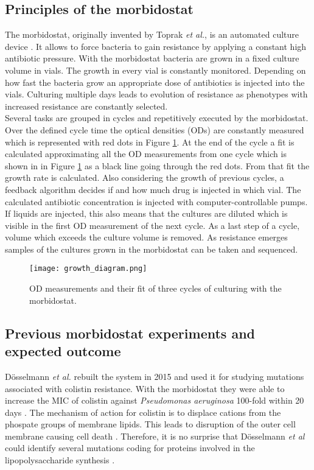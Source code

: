 \subsection{Principles of the morbidostat} 
The morbidostat, originally invented by Toprak \textit{et al.}, is an automated culture device \cite{toprak_building_2013}. It allows to force bacteria to gain resistance by applying a constant high antibiotic pressure. With the morbidostat bacteria are grown in a fixed culture volume in vials. The growth in every vial is constantly monitored. Depending on how fast the bacteria grow an appropriate dose of antibiotics is injected into the vials. Culturing multiple days leads to evolution of resistance as phenotypes with increased resistance are constantly selected. \\
Several tasks are grouped in cycles and repetitively executed by the morbidostat. Over the defined cycle time the optical densities (ODs) are constantly measured which is represented with red dots in Figure \ref{figure:principle}. At the end of the cycle a fit is calculated approximating all the OD measurements from one cycle which is shown in in Figure \ref{figure:principle} as a black line going through the red dots. From that fit the growth rate is calculated. Also considering the growth of previous cycles, a feedback algorithm decides if and how much drug is injected in which vial. The calculated antibiotic concentration is injected with computer-controllable pumps. If liquids are injected, this also means that the cultures are diluted which is visible in the first OD measurement of the next cycle. As a last step of a cycle, volume which exceeds the culture volume is removed. As resistance emerges samples of the cultures grown in the morbidostat can be taken and sequenced.    
\begin{figure}
	\texttt{[image: growth\_diagram.png]}
	\caption{OD measurements and their fit of three cycles of culturing with the morbidostat. }
	\label{figure:principle}
\end{figure} 

\subsection{Previous morbidostat experiments and expected outcome}
Dösselmann \textit{et al.} rebuilt the system in 2015  \cite{doselmann_rapid_2017} and used it for studying mutations associated with colistin resistance. With the morbidostat they were able to increase the MIC of colistin against \textit{Pseudomonas aeruginosa} 100-fold within 20 days \cite{doselmann_rapid_2017}. The mechanism of action for colistin is to displace cations from the phospate groups of membrane lipids. This leads to disruption of the outer cell membrane causing cell death \cite{noauthor_colistin:_nodate}. Therefore, it is no surprise that Dösselmann \textit{et al} could identify several mutations coding for proteins involved in the lipopolysaccharide synthesis \cite{doselmann_rapid_2017}.

